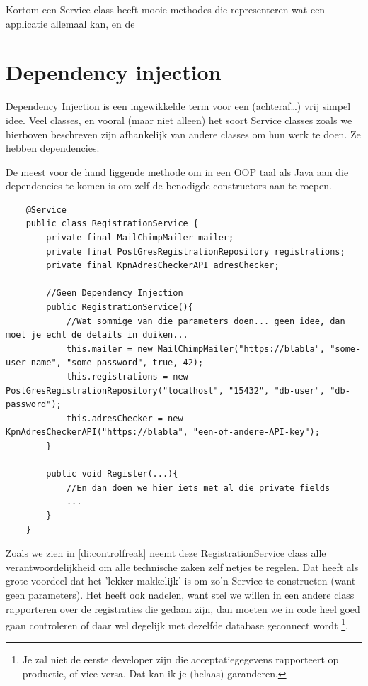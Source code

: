 Kortom een Service class heeft mooie methodes die representeren wat een applicatie allemaal kan, 
en de 

\section{Dependency injection}

Dependency Injection is een ingewikkelde term voor een (achteraf\ldots) vrij simpel idee. Veel
classes, en vooral (maar niet alleen) het soort Service classes zoals we hierboven beschreven
zijn afhankelijk van andere classes om hun werk te doen. Ze hebben dependencies.

De meest voor de hand liggende methode om in een OOP taal als Java aan die dependencies te komen
is om zelf de benodigde constructors aan te roepen.

\begin{listing}[H]
    \begin{verbatim}
    @Service
    public class RegistrationService {
        private final MailChimpMailer mailer;
        private final PostGresRegistrationRepository registrations;
        private final KpnAdresCheckerAPI adresChecker;

        //Geen Dependency Injection
        public RegistrationService(){
            //Wat sommige van die parameters doen... geen idee, dan moet je echt de details in duiken...
            this.mailer = new MailChimpMailer("https://blabla", "some-user-name", "some-password", true, 42);
            this.registrations = new PostGresRegistrationRepository("localhost", "15432", "db-user", "db-password");
            this.adresChecker = new KpnAdresCheckerAPI("https://blabla", "een-of-andere-API-key");
        }

        public void Register(...){
            //En dan doen we hier iets met al die private fields
            ...
        }
    }
    \end{verbatim}
    \caption{Een voorbeeld zonder Dependency Injection (een "Control Freak").}
    \label{di:controlfreak}
\end{listing}

Zoals we zien in \ref{di:controlfreak} neemt deze RegistrationService class alle verantwoordelijkheid
om alle technische zaken zelf netjes te regelen. Dat heeft als grote voordeel dat het 'lekker makkelijk'
is om zo'n Service te constructen (want geen parameters). Het heeft ook nadelen, want stel
we willen in een andere class rapporteren over de registraties die gedaan zijn, dan moeten we in
code heel goed gaan controleren of daar wel degelijk met dezelfde database geconnect wordt
\footnote{Je zal niet de eerste developer zijn die acceptatiegegevens rapporteert op productie, of vice-versa. 
Dat kan ik je (helaas) garanderen.}.

